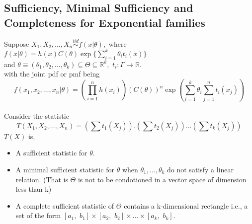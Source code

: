 \documentclass[12pt,a4paper]{article}
\begin{document}
\subsection{Sufficiency, Minimal Sufficiency and Completeness for Exponential families}
\begin{thm}
Suppose $X_1,X_2,\dots,X_n \overset{iid}{\sim} f(x|\theta),$ where $f(x|\theta)=h(x)C(\theta)\exp\{\sum \limits_{i=1}^k\theta_i t_i(x)\}$\\
and $\theta\equiv(\theta_1,\theta_2,\dots,\theta_k)\subseteq\Theta\subseteq\mathbb{R}^k, \,\, t_i:\Gamma\rightarrow\mathbb{R}.$\\
with the joint pdf or pmf being $$f(x_1,x_2,\dots,x_n|\theta)=\left(\prod\limits_{i=1}^n h(x_i)\right) \left(C(\theta)\right)^n \exp\left(\sum\limits_{i=1}^k \theta_i \sum\limits_{j=1}^n t_i(x_j) \right)$$\\
Consider the statistic $$T(X_1,X_2,\dots,X_n)= \left(\sum t_1(X_j)\right).\left(\sum t_2(X_j)\right)\dots \left(\sum t_k(X_j)\right)$$
$T(X)$ is,
\begin{itemize}
\item A sufficient statistic for  $\theta.$
\item A minimal sufficient statistic for $\theta$ when $\theta_1,\dots,\theta_k$ do not satisfy a linear relation. (That is $\Theta$ is not to be condotioned in a vector space of dimension less than k)
\item A complete sufficient statistic of $\Theta$ contains a k-dimensional rectangle i.e., a set of the form $[a_1,\,\, b_1]\times[a_2, \,\, b_2]\times\dots\times[a_k, \,\, b_k].$
\end{itemize}
\end{thm}
\end{document}
